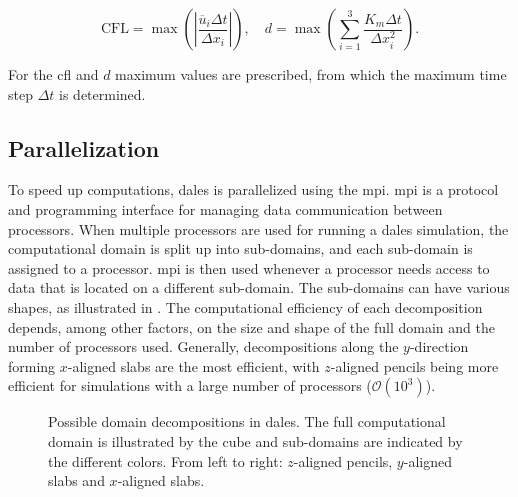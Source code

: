 \begin{equation}
    \text{CFL} = \max \left( \left| \frac{\overline{u}_i \Delta t}{\Delta x_i} \right| \right), \quad d = \max \left( \sum_{i=1}^{3} \frac{K_m \Delta t}{\Delta x_i^2} \right).
\end{equation}

For the \acrshort{cfl} and $d$ maximum values are prescribed, from which the maximum time step $\Delta t$ is determined.

\subsection{Parallelization} \label{sec:dales_mpi}
To speed up computations, \acrshort{dales} is parallelized using the \acrfull{mpi}. \acrshort{mpi} is a protocol and programming interface for managing data communication between processors. When multiple processors are used for running a \acrshort{dales} simulation, the computational domain is split up into sub-domains, and each sub-domain is assigned to a processor. \acrshort{mpi} is then used whenever a processor needs access to data that is located on a different sub-domain. The sub-domains can have various shapes, as illustrated in . The computational efficiency of each decomposition depends, among other factors, on the size and shape of the full domain and the number of processors used. Generally, decompositions along the $y$-direction forming $x$-aligned slabs are the most efficient, with $z$-aligned pencils being more efficient for simulations with a large number of processors ($\mathcal{O}(10^3)$). 

\begin{figure}[H]
    \centering
    
    \caption{Possible domain decompositions in \acrshort{dales}. The full computational domain is illustrated by the cube and sub-domains are indicated by the different colors. From left to right: $z$-aligned pencils, $y$-aligned slabs and $x$-aligned slabs.}
    \label{fig:dales_domain_decomposition}
\end{figure}

\newpage

